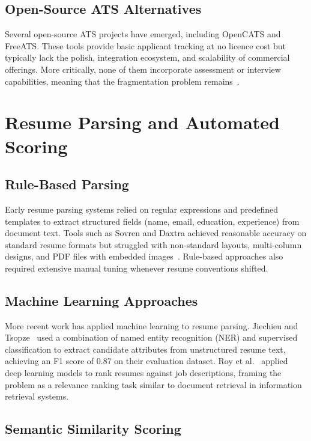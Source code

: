 \subsection{Open-Source ATS Alternatives}

Several open-source ATS projects have emerged, including OpenCATS and FreeATS. These tools provide basic applicant tracking at no licence cost but typically lack the polish, integration ecosystem, and scalability of commercial offerings. More critically, none of them incorporate assessment or interview capabilities, meaning that the fragmentation problem remains~\cite{malinowski2006}.

\section{Resume Parsing and Automated Scoring}
\label{sec:resume-review}

\subsection{Rule-Based Parsing}

Early resume parsing systems relied on regular expressions and predefined templates to extract structured fields (name, email, education, experience) from document text. Tools such as Sovren and Daxtra achieved reasonable accuracy on standard resume formats but struggled with non-standard layouts, multi-column designs, and PDF files with embedded images~\cite{yu2005}. Rule-based approaches also required extensive manual tuning whenever resume conventions shifted.

\subsection{Machine Learning Approaches}

More recent work has applied machine learning to resume parsing. Jiechieu and Tsopze~\cite{jiechieu2021} used a combination of named entity recognition (NER) and supervised classification to extract candidate attributes from unstructured resume text, achieving an F1 score of 0.87 on their evaluation dataset. Roy et al.~\cite{roy2020} applied deep learning models to rank resumes against job descriptions, framing the problem as a relevance ranking task similar to document retrieval in information retrieval systems.

\subsection{Semantic Similarity Scoring}

